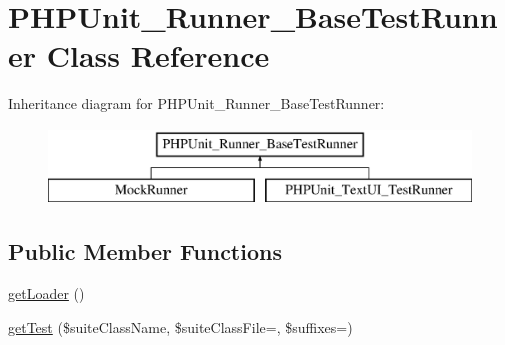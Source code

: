 \hypertarget{class_p_h_p_unit___runner___base_test_runner}{}\section{P\+H\+P\+Unit\+\_\+\+Runner\+\_\+\+Base\+Test\+Runner Class Reference}
\label{class_p_h_p_unit___runner___base_test_runner}
Inheritance diagram for P\+H\+P\+Unit\+\_\+\+Runner\+\_\+\+Base\+Test\+Runner\+:\begin{figure}[H]
\begin{center}
\leavevmode
\includegraphics[height=2.000000cm]{class_p_h_p_unit___runner___base_test_runner}
\end{center}
\end{figure}
\subsection*{Public Member Functions}
\begin{DoxyCompactItemize}
\item 
\mbox{\hyperlink{class_p_h_p_unit___runner___base_test_runner_a461527c1de39a5520c52951b8f03d99f}{get\+Loader}} ()
\item 
\mbox{\hyperlink{class_p_h_p_unit___runner___base_test_runner_acce3ddc863e8e98fc31f01cc7c82c9d6}{get\+Test}} (\$suite\+Class\+Name, \$suite\+Class\+File=\textquotesingle{}\textquotesingle{}, \$suffixes=\textquotesingle{}\textquotesingle{})
\end{DoxyCompactItemize}
